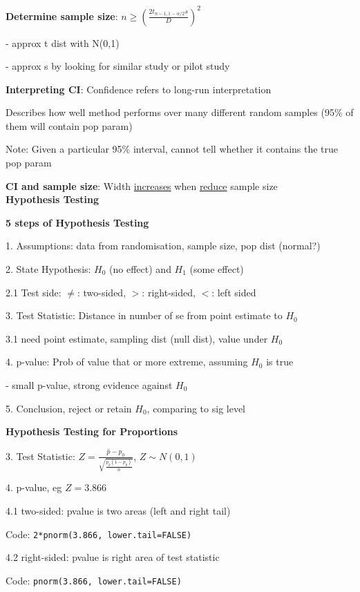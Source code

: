 \documentclass[10pt, a4paper]{article}
\newcommand{\red}[1]{{\color{red}#1}}
\newcommand{\header}[1]{{\normalsize\textbf{#1}}}
\newcommand{\tab}[0]{\hspace*{2mm}}
\begin{document}
\begin{multicols*}{3}
		\textbf{Determine sample size}: $n \geq (\frac{2t_{n - 1, 1 - \alpha / 2}s}{D})^2$

		\tab{} - approx t dist with N(0,1)
		
		\tab{} - approx s by looking for similar study or pilot study

		\textbf{Interpreting CI}: Confidence refers to long-run interpretation

		Describes how well method performs over many different random samples (95\% of them will contain pop param)

		\red{Note}: Given a particular 95\% interval, cannot tell whether it contains the true pop param 

		\textbf{CI and sample size}: Width \underline{increases} when \underline{reduce} sample size\\

		\header{Hypothesis Testing}

		\textbf{5 steps of Hypothesis Testing}

		1. Assumptions: data from randomisation, sample size, pop dist (normal?)

		2. State Hypothesis: $H_0$ (no effect) and $H_1$ (some effect)

		\tab{} 2.1 Test side: $\neq$: two-sided, $>$: right-sided, $<$: left sided

		3. Test Statistic: Distance in number of se from point estimate to $H_0$

		\tab{} 3.1 need point estimate, sampling dist (null dist), value under $H_0$

		4. p-value: Prob of value that or more extreme, assuming $H_0$ is true

		\tab{} - small p-value, strong evidence against $H_0$

		5. Conclusion, reject or retain $H_0$, comparing to sig level

		\textbf{Hypothesis Testing for Proportions}

		3. Test Statistic: $Z = \frac{\hat{p} - p_0}{\sqrt{\frac{p_0(1-p_0)}{n}}}$, $Z \sim N(0,1)$

		4. p-value, eg $Z = 3.866$

		\tab{} 4.1 two-sided: pvalue is two areas (left and right tail)

		\tab{} Code: \texttt{2*pnorm(3.866, lower.tail=FALSE)}

		\tab{} 4.2 right-sided: pvalue is right area of test statistic

		\tab{} Code: \texttt{pnorm(3.866, lower.tail=FALSE)}


\end{multicols*}
\end{document}
